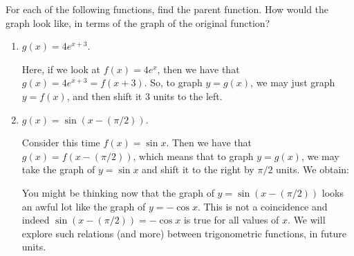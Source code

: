 \documentclass{ximera}
\begin{document}
\begin{example}
  For each of the following functions, find the parent function. How would the graph look like, in terms of the graph of the original function?
  \begin{enumerate}[label=\alph*.]
  \item $g(x) = 4e^{x+3}$. \\[.5em]
    \begin{explanation}
      Here, if we look at $f(x) = 4e^x$, then we have that $g(x) = 4e^{x+3} = f(x+3)$. So, to graph $y=g(x)$, we may just graph $y = f(x)$, and then shift it $3$ units to the left.
      \begin{image}
      \end{image}
    \end{explanation}
  \item $g(x) = \sin(x - (\pi/2))$. \\[.5em]
    \begin{explanation}
      Consider this time $f(x) = \sin x$. Then we have that $g(x) = f(x-(\pi/2))$, which means that to graph $y=g(x)$, we may take the graph of $y=\sin x$ and shift it to the right by $\pi/2$ units. We obtain:
            \begin{image}
      \end{image}
      You might be thinking now that the graph of $y = \sin(x-(\pi/2))$ looks an awful lot like the graph of $y = -\cos x$. This is not a coincidence and indeed $\sin(x-(\pi/2)) = -\cos x$ is true for all values of $x$. We will explore such relations (and more) between trigonometric functions, in future units.

\end{explanation}
\end{enumerate}
\end{example}
\end{document}
